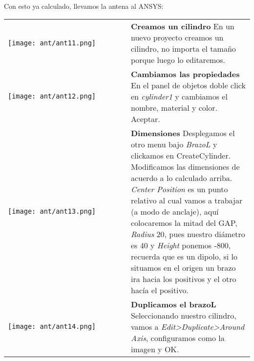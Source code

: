 \documentclass[
	12pt, %
	fleqn, %
	a4paper, %
	oneside, %
]{LegrandOrangeBook}
\begin{document}
Con esto ya calculado, llevamos la antena al ANSYS:\\
\begin{tabular}{k{0.5\linewidth}  j{0.5\linewidth}}
        \texttt{[image: ant/ant11.png]} & \textbf{Creamos un cilindro} \newline 
        En un nuevo proyecto creamos un cilindro, no importa el tamaño porque luego lo editaremos. \\
        \texttt{[image: ant/ant12.png]} & \textbf{Cambiamos las propiedades} \newline 
        En el panel de objetos doble click en \textit{cylinder1} y cambiamos el nombre, material y color. Aceptar.\\
        \texttt{[image: ant/ant13.png]} & \textbf{Dimensiones} \newline 
        Desplegamos el otro menu bajo \textit{BrazoL} y clickamos en CreateCylinder. Modificamos las dimensiones de acuerdo a lo calculado arriba. \textit{Center Position} es un punto relativo al cual vamos a trabajar (a modo de anclaje), aquí colocaremos la mitad del GAP, \textit{Radius} 20, pues nuestro diámetro es 40 y \textit{Height} ponemos -800, recuerda que es un dipolo, si lo situamos en el origen un brazo ira hacia los positivos y el otro hacía el positivo.\\
        \texttt{[image: ant/ant14.png]} & \textbf{Duplicamos el brazoL} \newline 
        Seleccionando nuestro cilindro, vamos a \textit{Edit>Duplicate>Around Axis}, configuramos como la imagen y OK.
    \end{tabular}
   
\end{document}
